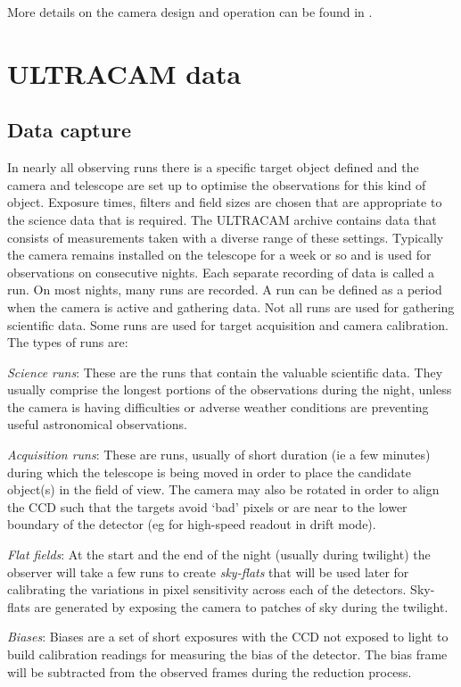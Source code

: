 More details on the camera design and operation can be found in \citet{dhillon07}.

\section{ULTRACAM data}

\subsection{Data capture}
In nearly all observing runs there is a specific target object defined and the camera and telescope are set up to optimise the observations for this kind of object. Exposure times, filters and field sizes are chosen that are appropriate to the science data that is required. The ULTRACAM archive contains data that consists of measurements taken with a diverse range of these settings. Typically the camera remains installed on the telescope for a week or so and is used for observations on consecutive nights. Each separate recording of data is called a run. On most nights, many runs are recorded. A run can be defined as a period when the camera is active and gathering data. Not all runs are used for gathering scientific data. Some runs are used for target acquisition and camera calibration. The types of runs are:

\emph{Science runs}: These are the runs that contain the valuable scientific data. They usually comprise the longest portions of the observations during the night, unless the camera is having difficulties or adverse weather conditions are preventing useful astronomical observations.

\emph{Acquisition runs}: These are runs, usually of short duration (ie a few minutes) during which the telescope is being moved in order to place the candidate object(s) in the field of view. The camera may also be rotated in order to align the CCD such that the targets avoid `bad' pixels or are near to the lower boundary of the detector (eg for high-speed readout in drift mode). 

\emph{Flat fields}: At the start and the end of the night (usually during twilight) the observer will take a few runs to create \emph{sky-flats} that will be used later for calibrating the variations in pixel sensitivity across each of the detectors.  Sky-flats are generated by exposing the camera to patches of sky during the twilight. 

\emph{Biases}: Biases are a set of short exposures with the CCD not exposed to light to build calibration readings for measuring the bias of the detector. The bias frame will be subtracted from the observed frames during the reduction process. 

